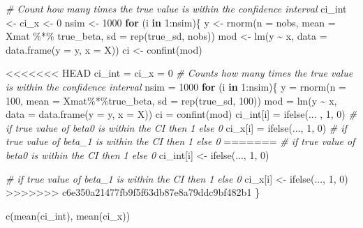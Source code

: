 \documentclass[
]{article}
\newenvironment{Shaded}{\begin{snugshade}}{\end{snugshade}}
\newcommand{\AttributeTok}[1]{\textcolor[rgb]{0.77,0.63,0.00}{#1}}
\newcommand{\CommentTok}[1]{\textcolor[rgb]{0.56,0.35,0.01}{\textit{#1}}}
\newcommand{\ControlFlowTok}[1]{\textcolor[rgb]{0.13,0.29,0.53}{\textbf{#1}}}
\newcommand{\DecValTok}[1]{\textcolor[rgb]{0.00,0.00,0.81}{#1}}
\newcommand{\FunctionTok}[1]{\textcolor[rgb]{0.00,0.00,0.00}{#1}}
\newcommand{\NormalTok}[1]{#1}
\newcommand{\OtherTok}[1]{\textcolor[rgb]{0.56,0.35,0.01}{#1}}
\newcommand{\SpecialCharTok}[1]{\textcolor[rgb]{0.00,0.00,0.00}{#1}}
\begin{document}
\begin{Shaded}
\begin{Highlighting}[]
\CommentTok{\# Count how many times the true value is within the confidence interval}
\NormalTok{ci\_int }\OtherTok{\textless{}{-}}\NormalTok{ ci\_x }\OtherTok{\textless{}{-}} \DecValTok{0}
\NormalTok{nsim }\OtherTok{\textless{}{-}} \DecValTok{1000}
\ControlFlowTok{for}\NormalTok{ (i }\ControlFlowTok{in} \DecValTok{1}\SpecialCharTok{:}\NormalTok{nsim)\{}
\NormalTok{  y }\OtherTok{\textless{}{-}} \FunctionTok{rnorm}\NormalTok{(}\AttributeTok{n =}\NormalTok{ nobs, }\AttributeTok{mean =}\NormalTok{ Xmat }\SpecialCharTok{\%*\%}\NormalTok{ true\_beta, }\AttributeTok{sd =} \FunctionTok{rep}\NormalTok{(true\_sd, nobs))}
\NormalTok{  mod }\OtherTok{\textless{}{-}} \FunctionTok{lm}\NormalTok{(y }\SpecialCharTok{\textasciitilde{}}\NormalTok{ x, }\AttributeTok{data =} \FunctionTok{data.frame}\NormalTok{(}\AttributeTok{y =}\NormalTok{ y, }\AttributeTok{x =}\NormalTok{ X))}
\NormalTok{  ci }\OtherTok{\textless{}{-}} \FunctionTok{confint}\NormalTok{(mod)}

<<<<<<< HEAD
\NormalTok{ci\_int }\OtherTok{=}\NormalTok{ ci\_x }\OtherTok{=} \DecValTok{0} \CommentTok{\# Counts how many times the true value is within the confidence interval}
\NormalTok{nsim }\OtherTok{=} \DecValTok{1000}
\ControlFlowTok{for}\NormalTok{ (i }\ControlFlowTok{in} \DecValTok{1}\SpecialCharTok{:}\NormalTok{nsim)\{}
\NormalTok{  y }\OtherTok{=} \FunctionTok{rnorm}\NormalTok{(}\AttributeTok{n =} \DecValTok{100}\NormalTok{, }\AttributeTok{mean =}\NormalTok{ Xmat}\SpecialCharTok{\%*\%}\NormalTok{true\_beta, }\AttributeTok{sd =} \FunctionTok{rep}\NormalTok{(true\_sd, }\DecValTok{100}\NormalTok{))}
\NormalTok{  mod }\OtherTok{=} \FunctionTok{lm}\NormalTok{(y }\SpecialCharTok{\textasciitilde{}}\NormalTok{ x, }\AttributeTok{data =} \FunctionTok{data.frame}\NormalTok{(}\AttributeTok{y =}\NormalTok{ y, }\AttributeTok{x =}\NormalTok{ X))}
\NormalTok{  ci }\OtherTok{=} \FunctionTok{confint}\NormalTok{(mod)}
\NormalTok{  ci\_int[i] }\OtherTok{=} \FunctionTok{ifelse}\NormalTok{(... , }\DecValTok{1}\NormalTok{, }\DecValTok{0}\NormalTok{) }\CommentTok{\# if true value of beta0 is within the CI then 1 else 0}
\NormalTok{  ci\_x[i] }\OtherTok{=} \FunctionTok{ifelse}\NormalTok{(..., }\DecValTok{1}\NormalTok{, }\DecValTok{0}\NormalTok{) }\CommentTok{\# if true value of beta\_1 is within the CI then 1 else 0}
=======
  \CommentTok{\# if true value of beta0 is within the CI then 1 else 0}
\NormalTok{  ci\_int[i] }\OtherTok{\textless{}{-}} \FunctionTok{ifelse}\NormalTok{(..., }\DecValTok{1}\NormalTok{, }\DecValTok{0}\NormalTok{)}

  \CommentTok{\# if true value of beta\_1 is within the CI then 1 else 0}
\NormalTok{  ci\_x[i] }\OtherTok{\textless{}{-}} \FunctionTok{ifelse}\NormalTok{(..., }\DecValTok{1}\NormalTok{, }\DecValTok{0}\NormalTok{)}
>>>>>>> c6e350a21477fb9f5f63db87e8a79ddc9bf482b1
\NormalTok{\}}

\FunctionTok{c}\NormalTok{(}\FunctionTok{mean}\NormalTok{(ci\_int), }\FunctionTok{mean}\NormalTok{(ci\_x))}
\end{Highlighting}
\end{Shaded}
\end{document}
